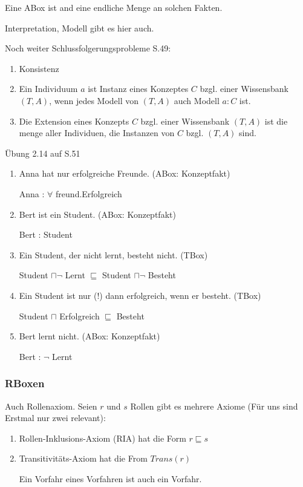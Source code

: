 \documentclass[a4paper]{article}
\begin{document}
Eine ABox ist and eine endliche Menge an solchen Fakten.

Interpretation, Modell gibt es hier auch.

Noch weiter Schlussfolgerungsprobleme S.49:

\begin{enumerate}
    \item Konsistenz
    \item Ein Individuum $a$ ist Instanz eines Konzeptes $C$ bzgl. einer Wissensbank $(T, A)$, wenn jedes Modell von $(T, A)$ auch Modell $a:C$ ist.
    \item Die Extension eines Konzepts $C$ bzgl. einer Wissensbank $(T, A)$ ist die menge aller Individuen, die Instanzen von $C$ bzgl. $(T, A)$ sind.
\end{enumerate}


Übung 2.14 auf S.51

\begin{enumerate}
    \item Anna hat nur erfolgreiche Freunde. (ABox: Konzeptfakt)
    
    Anna : $\forall$ freund.Erfolgreich
    \item Bert ist ein Student. (ABox: Konzeptfakt)
    
    Bert : Student
    \item Ein Student, der nicht lernt, besteht nicht. (TBox)
    
    Student $\sqcap \neg$ Lernt $\sqsubseteq$ Student $\sqcap \neg$ Besteht  
    \item Ein Student ist nur (!) dann erfolgreich, wenn er besteht. (TBox)
    
    Student $\sqcap$ Erfolgreich $\sqsubseteq$ Besteht
    \item Bert lernt nicht. (ABox: Konzeptfakt)
    
    Bert : $\neg$ Lernt
\end{enumerate}

\subsubsection{RBoxen}

Auch Rollenaxiom. Seien $r$ und $s$ Rollen gibt es mehrere Axiome (Für uns sind Erstmal nur zwei relevant):

\begin{enumerate}
    \item Rollen-Inklusions-Axiom (RIA) hat die Form $r \sqsubseteq s$
    \item Transitivitäts-Axiom hat die From $Trans(r)$
    
    Ein Vorfahr eines Vorfahren ist auch ein Vorfahr.
\end{enumerate}
\end{document}

